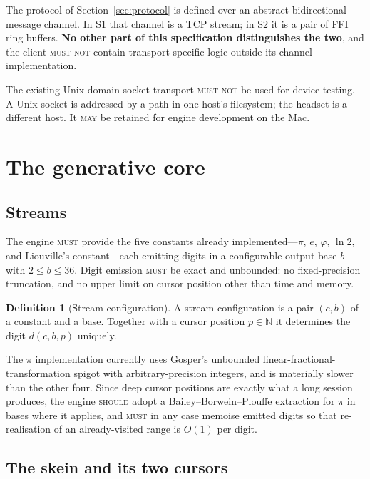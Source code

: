 \documentclass[11pt,a4paper]{article}
\newcommand{\MUST}{\textsc{must}}
\newcommand{\MUSTNOT}{\textsc{must not}}
\newcommand{\SHOULD}{\textsc{should}}
\newcommand{\MAY}{\textsc{may}}
\theoremstyle{definition}
\newtheorem{definition}{Definition}
\theoremstyle{plain}
\theoremstyle{remark}
\begin{document}
The protocol of Section~\ref{sec:protocol} is defined over an abstract bidirectional message
channel. In S1 that channel is a TCP stream; in S2 it is a pair of FFI ring buffers. \textbf{No
other part of this specification distinguishes the two}, and the client \MUSTNOT{} contain
transport-specific logic outside its channel implementation.

The existing Unix-domain-socket transport \MUSTNOT{} be used for device testing. A Unix socket is
addressed by a path in one host's filesystem; the headset is a different host. It \MAY{} be
retained for engine development on the Mac.

\section{The generative core}

\subsection{Streams}

The engine \MUST{} provide the five constants already implemented---$\pi$, $e$, $\varphi$, $\ln 2$,
and Liouville's constant---each emitting digits in a configurable output base $b$ with
$2 \le b \le 36$. Digit emission \MUST{} be exact and unbounded: no fixed-precision truncation, and
no upper limit on cursor position other than time and memory.

\begin{definition}[Stream configuration]
A stream configuration is a pair $(c, b)$ of a constant and a base. Together with a cursor position
$p \in \mathbb{N}$ it determines the digit $d(c, b, p)$ uniquely.
\end{definition}

The $\pi$ implementation currently uses Gosper's unbounded linear-fractional-transformation spigot
with arbitrary-precision integers, and is materially slower than the other four. Since deep cursor
positions are exactly what a long session produces, the engine \SHOULD{} adopt a
Bailey--Borwein--Plouffe extraction for $\pi$ in bases where it applies, and \MUST{} in any case
memoise emitted digits so that re-realisation of an already-visited range is $O(1)$ per digit.

\subsection{The skein and its two cursors}
\end{document}
